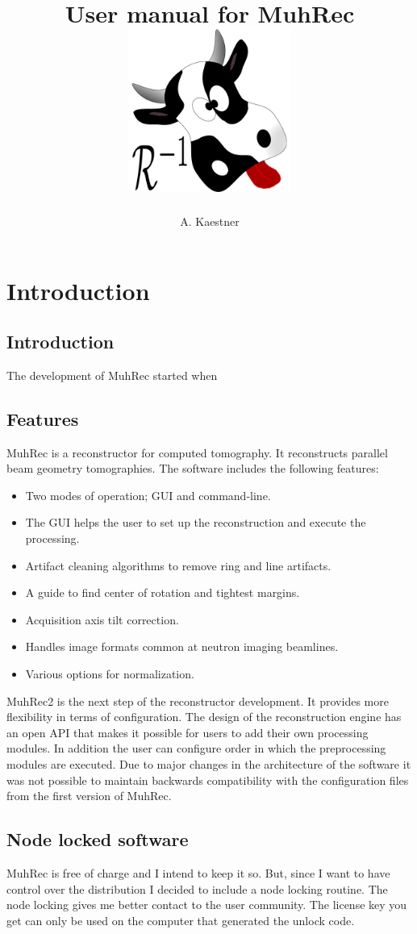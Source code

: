 \documentclass[a4paper]{scrreprt}
\title{User manual for MuhRec\\\vskip30pt\includegraphics[width=0.4\textwidth]{figures/muh_icon.pdf}}
\author{A. Kaestner}
\begin{document}
\maketitle
\tableofcontents
\chapter{Introduction}
\section{Introduction}
The development of MuhRec started when
\section{Features}
MuhRec is a reconstructor for computed tomography. It reconstructs parallel beam geometry tomographies.
The software includes the following features:
\begin{itemize}
\item Two modes of operation; GUI and command-line.
\item The GUI helps the user to set up the reconstruction and execute the processing.
\item Artifact cleaning algorithms to remove ring and line artifacts.
\item A guide to find center of rotation and tightest margins.
\item Acquisition axis tilt correction.
\item Handles image formats common at neutron imaging beamlines.
\item Various options for normalization.
\end{itemize}

MuhRec2 is the next step of the reconstructor development. It provides more
flexibility in
terms of configuration. The design of the reconstruction engine has an open API
that makes it possible for users to add their own processing modules. In
addition the user can configure order in which the preprocessing modules are
executed. Due to major changes in the architecture of the software it was not
possible to maintain backwards compatibility with the configuration files from
the first version of MuhRec.

\section{Node locked software}
MuhRec is free of charge and I intend to keep it so. But, since I want to have control over
the distribution I decided to include a node locking routine. The node locking gives me
better contact to the user community. The license key you get can only be used on the
computer that generated the unlock code.
\end{document}
